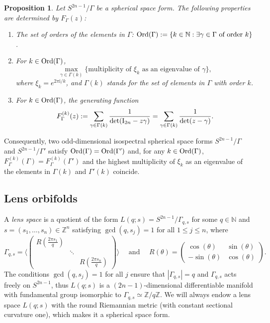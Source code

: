 \documentclass[12pt,a4paper,final]{amsart}
\theoremstyle{plain}
\newtheorem{proposition}[theorem]{Proposition}
\theoremstyle{definition}
\theoremstyle{remark}
\numberwithin{equation}{section}
\newcommand{\N}{\mathbb N}
\newcommand{\Z}{\mathbb Z}
\newcommand{\Id}{\textup{I}}
\newcommand{\mi}{\mathrm{i}}
\newcommand{\orders}{\textup{Ord}}
\begin{document}
\begin{proposition}\label{prop:specinvariantsIkeda}
Let $S^{2n-1}/\Gamma$ be a spherical space form. 
The following properties are determined by $F_{\Gamma}(z)$: 
\begin{enumerate}
\item\label{item:orders} 
The set of orders of the elements in $\Gamma$: $\orders(\Gamma):=\{k\in\N: \exists  \gamma\in\Gamma\text{ of order $k$}\}$. 

\item\label{item:maxmultip}
For $k\in \orders(\Gamma)$,
$$
\max_{\gamma\in\Gamma(k)} \{ \text{multiplicity of $\xi_{k}$ as an eigenvalue of $\gamma$} \}
,
$$ 
where $\xi_k=e^{2\pi\mi/k}$, and $\Gamma(k)$ stands for the set of elements in $\Gamma$ with order $k$. 

\item\label{item:F^k}
For $k\in \orders(\Gamma)$, the generating function
$$
F_{\Gamma}^{(k)}(z)
:=\sum_{\gamma\in\Gamma(k)} \frac{1}{\det(\Id_{2n}-z\gamma)}
=\sum_{\gamma\in\Gamma(k)} \frac{1}{\det(z-\gamma)}
. 
$$
\end{enumerate}
\end{proposition}


Consequently, two odd-dimensional isospectral spherical space forms $S^{2n-1}/\Gamma$ and $S^{2n-1}/\Gamma'$ satisfy $\orders(\Gamma)=\orders(\Gamma')$ and, for any $k\in\orders(\Gamma)$, $F_{\Gamma}^{(k)}(\Gamma)= F_{\Gamma}^{(k)}(\Gamma')$ and 
the highest multiplicity of $\xi_k$ as an eigenvalue of  the elements in $\Gamma(k)$ and $\Gamma'(k)$ coincide. 







\subsection{Lens orbifolds}\label{subsec:lens}

A \emph{lens space} is a quotient of the form $L(q;s)=S^{2n-1}/\Gamma_{q,s}$ for some $q\in\N$ and $s=(s_1,\dots,s_n)\in\Z^n$ satisfying $\gcd(q,s_j)=1$ for all $1\leq j\leq n$, where 
\begin{equation}\label{eq:Gamma_qs}
\Gamma_{q,s}
= \Big\langle
\begin{pmatrix}
R(\tfrac{2\pi s_1}{q}) \\
&\ddots\\
&&R(\tfrac{2\pi s_n}{q}) 
\end{pmatrix}
\Big\rangle
\quad\text{ and }\quad
R(\theta)=  \begin{pmatrix}
\cos(\theta)&\sin(\theta)\\ -\sin(\theta)&\cos(\theta)\end{pmatrix}
.
\end{equation}
The conditions $\gcd(q,s_j)=1$ for all $j$ ensure that $|\Gamma_{q,s}|=q$ and $\Gamma_{q,s}$ acts freely on $S^{2n-1}$, thus $L(q;s)$ is a $(2n-1)$-dimensional differentiable manifold with fundamental group isomorphic to $\Gamma_{q,s}\simeq\Z/q\Z$.
We will always endow a lens space $L(q;s)$ with the round Riemannian metric (with constant sectional curvature one), which makes it a spherical space form. 
\end{document}
